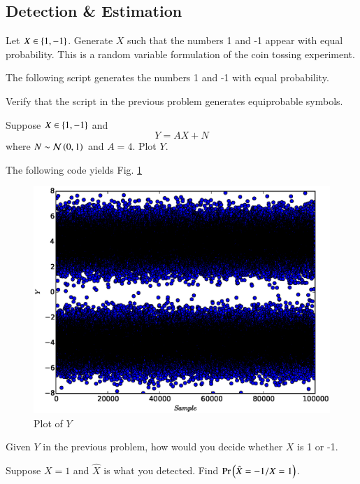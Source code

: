 %
\subsection{Detection \& Estimation}
\begin{problem}
Let $X \in \left\{1,-1\right\}$.  Generate $X$ such that the numbers 1 and -1 appear with equal probability.  This is a random variable formulation of the coin tossing experiment.
\end{problem}
\solution  The following script generates the numbers 1 and -1 with 
equal probability.

%
\begin{problem}
Verify that the script in the previous problem generates equiprobable symbols.
\end{problem}
\begin{problem}
Suppose $X \in \left\{1,-1\right\}$ and 
%
\begin{equation}
Y = AX + N
\end{equation}
%
where $N \sim \mathcal{N}\left(0,1\right)$ and $A = 4$.  Plot $Y$.
\end{problem}
\solution The following code yields Fig. \ref{ch2_bpsk_sim}

%
\begin{figure}
\centering
\includegraphics[width=\columnwidth]{./chapter2/figs/ch2_bpsk_sim}
\caption{Plot of $Y$}
\label{ch2_bpsk_sim}
\end{figure}
%
\begin{problem}
Given $Y$ in the previous problem, how would you decide whether $X$ is 1
or -1.
\end{problem}
%
\begin{problem}
Suppose $X=1$ and $\hat{X}$ is what you detected.  Find $\Pr\left(\hat{X}=-1/X=1\right)$.
\end{problem}
